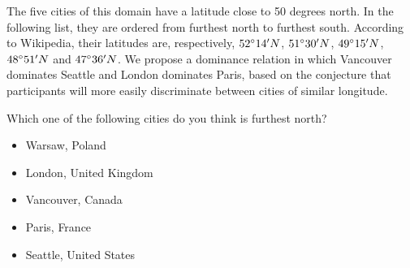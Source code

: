 The five cities of this domain have a latitude close to 50 degrees north.
In the following list, they are ordered from furthest north to furthest south.
According to Wikipedia, their latitudes are, respectively, $52\degree14^\prime N$, $51\degree30^\prime N$, $49\degree15^\prime N$, $48\degree51^\prime N$ and $47\degree36^\prime N$.
We propose a dominance relation in which Vancouver dominates Seattle and London dominates Paris, based on the conjecture that participants will more easily discriminate between cities of similar longitude.

\begin{tcolorbox}
Which one of the following cities do you think is furthest north?

\begin{itemize}
	\item Warsaw, Poland
	\item London, United Kingdom
	\item Vancouver, Canada
	\item Paris, France
	\item Seattle, United States
\end{itemize}
\end{tcolorbox}

